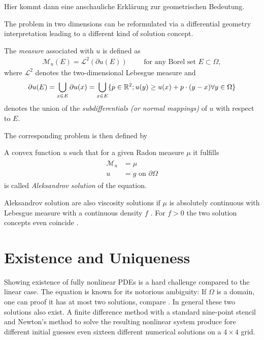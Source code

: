 Hier kommt dann eine anschauliche Erklärung zur geometrischen Bedeutung.

The \MA problem in two dimensions can be reformulated via a differential geometry interpretation leading to a different kind of solution concept.

\begin{definition}\label{def:MA measure}
	The \emph{\MA measure} associated with $u$ is defined as 
	\begin{align}
		\mathcal{M}_u (E) = \mathcal{L}^2(\partial u(E)) \qquad \text{ for any Borel set } E \subset \Omega,
	\end{align}
	where $\mathcal{L}^2$ denotes the two-dimensional Lebesgue measure and 
	\[
		\partial u(E) = \bigcup_{x \in E} \partial u (x) = \bigcup_{x \in E} \{p \in \mathbb{R}^2; u(y) \geq u(x) +p\cdot (y-x) \forall y \in \Omega\}
	\]
	denotes the union of the \emph{subdifferentials (or normal mappings)} of $u$ with respect to $E$.
\end{definition}
The corresponding \MA problem is then defined by

\begin{definition}\label{def:aleksandrov solution}
A convex function $u$ such that for a given Radon measure $\mu$ it fulfills
\begin{align}
\begin{split}
\mathcal M_u&= \mu \\ 
u &= g  \text{ on } \partial \Omega
\end{split}
\end{align}
is called \emph{Aleksandrov solution} of the \MA equation.
\end{definition}

Aleksandrov solution are also viscosity solutions if $\mu$ is absolutely continuous with Lebesgue measure with a continuous density $f$ \cite[proposition 1.3.4.]{Gutierrez2001} . For $f > 0$ the two solution concepts even coincide \cite[proposition 1.7.1]{Gutierrez2001}. 

\section{Existence and Uniqueness}
Showing existence of fully nonlinear PDEs is a hard challenge compared to the linear case. 
The \MA equation is known for its notorious ambiguity: If $\Omega$ is a domain, one can proof it has at most two solutions, compare \cite[Kap.IV, \S 5,3]{CH1968}. In general these two solutions also exist.
A finite difference method with a standard nine-point stencil and Newton's method to solve the resulting nonlinear system produce fore different initial guesses even sixteen different numerical solutions on a $4 \times 4$ grid\cite{FGN2013}. 

